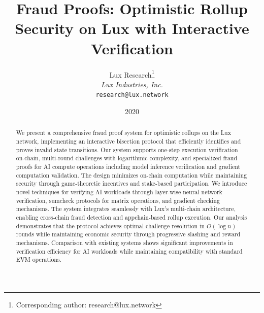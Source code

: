 \documentclass[11pt,a4paper]{article}
\title{Fraud Proofs: Optimistic Rollup Security on Lux with Interactive Verification}
\author{
Lux Research\thanks{Corresponding author: research@lux.network}\\
\textit{Lux Industries, Inc.}\\
\texttt{research@lux.network}
}
\date{2020}
\theoremstyle{definition}
\begin{document}
\luxcoverpage

\begin{abstract}
We present a comprehensive fraud proof system for optimistic rollups on the Lux network, implementing an interactive bisection protocol that efficiently identifies and proves invalid state transitions. Our system supports one-step execution verification on-chain, multi-round challenges with logarithmic complexity, and specialized fraud proofs for AI compute operations including model inference verification and gradient computation validation. The design minimizes on-chain computation while maintaining security through game-theoretic incentives and stake-based participation. We introduce novel techniques for verifying AI workloads through layer-wise neural network verification, sumcheck protocols for matrix operations, and gradient checking mechanisms. The system integrates seamlessly with Lux's multi-chain architecture, enabling cross-chain fraud detection and appchain-based rollup execution. Our analysis demonstrates that the protocol achieves optimal challenge resolution in $O(\log n)$ rounds while maintaining economic security through progressive slashing and reward mechanisms. Comparison with existing systems shows significant improvements in verification efficiency for AI workloads while maintaining compatibility with standard EVM operations.
\end{abstract}
























\end{document}

